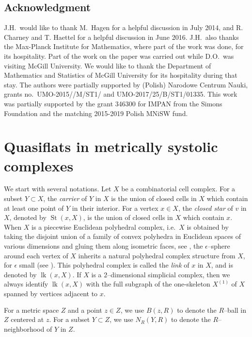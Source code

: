 \documentclass[11pt]{amsart}
\newcommand{\lk}{\operatorname{lk}}
\newcommand{\St}{\operatorname{St}}
\theoremstyle{definition}
\begin{document}
\subsection*{Acknowledgment}
J.H.\ would like to thank M.\ Hagen for a helpful discussion in July 2014, and R. Charney and T. Haettel for a helpful discussion in June 2016. J.H.\ also thanks the Max-Planck Institute for Mathematics, where part of the work was done, for its hospitality. Part of the work on the paper was carried out while D.O.\ was visiting McGill University.
We would like to thank the Department of Mathematics and Statistics of McGill University
for its hospitality during that stay.
The authors were partially supported by (Polish) Narodowe Centrum Nauki, grants no.\ UMO-2015//\-M/\-ST1/ and UMO-2017/25/B/ST1/01335. This work was partially supported by the grant 346300 for IMPAN from the Simons Foundation and the matching 2015-2019 Polish MNiSW fund.

\section{Quasiflats in metrically systolic complexes}
\label{sec:quasiflats in MS complex}

We start with several notations. Let $X$ be a combinatorial cell complex. For a subset $Y\subset X$, the \emph{carrier} of $Y$ in $X$ is the union of closed cells in $X$ which contain at least one point of $Y$ in their interior. For a vertex $x\in X$, the \emph{closed star} of $v$ in $X$, denoted by $\St(x,X)$, is the union of closed cells in $X$ which contain $x$. When $X$ is a piecewise Euclidean polyhedral complex, i.e.\ $X$ is obtained by taking the disjoint union of a family of convex polyhedra in Euclidean spaces of various dimensions and gluing them along isometric faces, see \cite[Definition I.7.37]{BridsonHaefliger1999}, the $\epsilon$--sphere around each vertex of $X$ inherits a natural polyhedral complex structure from $X$, for $\epsilon$ small (see \cite[Definition I.7.15]{BridsonHaefliger1999}). This polyhedral complex is called the \emph{link} of $x$ in $X$, and is denoted by $\lk(x,X)$. If $X$ is a $2$--dimensional simplicial complex, then we always identify $\lk(x,X)$ with the full subgraph of the one-skeleton $X^{(1)}$ of $X$ spanned by vertices adjacent to $x$.

For a metric space $Z$ and a point $z\in Z$, we use $B(z,R)$ to denote the $R$--ball in $Z$ centered at $z$. For a subset $Y\subset Z$, we use $N_R(Y,R)$ to denote the $R$--neighborhood of $Y$ in $Z$.
\end{document}
